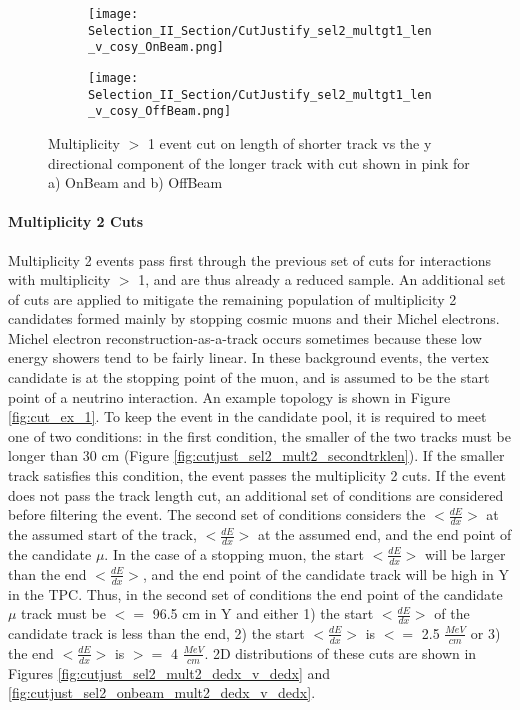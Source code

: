 \begin{figure}[H]
\centering
  \begin{subfigure}[t]{0.25\textwidth}
    \centering
\texttt{[image: Selection\_II\_Section/CutJustify\_sel2\_multgt1\_len\_v\_cosy\_OnBeam.png]}
 \caption{ }
  \end{subfigure} 
  \hspace{20mm}
  \begin{subfigure}[t]{0.25\textwidth}
    \centering
  \texttt{[image: Selection\_II\_Section/CutJustify\_sel2\_multgt1\_len\_v\_cosy\_OffBeam.png]}
   \caption{ }
  \end{subfigure} 
\caption{ Multiplicity $>$ 1 event cut on length of shorter track vs the y directional component of the longer track with cut shown in pink for a) OnBeam and b) OffBeam }
\label{fig:cutjust_sel2_onbeam_multgt1_len_v_cosy}
\end{figure}

\paragraph{Multiplicity 2 Cuts}
Multiplicity 2 events pass first through the previous set of cuts for interactions with multiplicity $>$ 1, and are thus already a reduced sample. An additional set of cuts are applied to mitigate the remaining population of multiplicity 2 candidates formed mainly by stopping cosmic muons and their Michel electrons. Michel electron reconstruction-as-a-track occurs sometimes because these low energy showers tend to be fairly linear.  In these background events, the vertex candidate is at the stopping point of the muon, and is assumed to be the start point of a neutrino interaction. An example topology is shown in Figure \ref{fig:cut_ex_1}. To keep the event in the candidate pool, it is required to meet one of two conditions: in the first condition, the smaller of the two tracks must be longer than 30 cm (Figure \ref{fig:cutjust_sel2_mult2_secondtrklen}). If the smaller track satisfies this condition, the event passes the multiplicity 2 cuts. If the event does not pass the track length cut, an additional set of conditions are considered before filtering the event.  The second set of conditions considers the $<\frac{dE}{dx}>$ at the assumed start of the track, $<\frac{dE}{dx}>$ at the assumed end, and the end point of the candidate $\mu$.  In the case of a stopping muon, the start $<\frac{dE}{dx}>$ will be larger than the end $<\frac{dE}{dx}>$, and the end point of the candidate track will be high in Y in the TPC.  Thus, in the second set of conditions the end point of the candidate $\mu$ track must be $<=$ 96.5 cm in Y and either 1) the start $<\frac{dE}{dx}>$ of the candidate track is less than the end, 2) the start $<\frac{dE}{dx}>$ is $<=$ 2.5 $\frac{MeV}{cm}$ or 3) the end $<\frac{dE}{dx}>$ is $>=$ 4 $\frac{MeV}{cm}$. 2D distributions of these cuts are shown in Figures \ref{fig:cutjust_sel2_mult2_dedx_v_dedx} and \ref{fig:cutjust_sel2_onbeam_mult2_dedx_v_dedx}.

